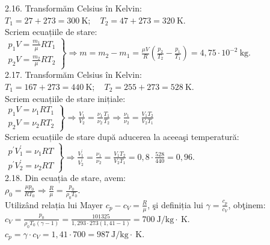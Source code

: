 2.16. Transformăm Celsius în Kelvin:\\ $T_{1}=27+273=300 \mathrm{~K}; \quad T_{2}=47+273=320 \mathrm{~K}$.\\ Scriem ecuațiile de stare:\\ $\left.\begin{array}{l} p_{1} V=\frac{m_{1}}{\mu} R T_{1}\\ p_{2} V=\frac{m_{2}}{\mu} R T_{2} \end{array}\right\} \Rightarrow m=m_{2}-m_{1}=\frac{\mu V}{R}\left(\frac{p_{2}}{T_{2}}-\frac{p_{1}}{T_{1}}\right)=4,75 \cdot 10^{-2} \mathrm{~kg}$.\\

2.17. Transformăm Celsius în Kelvin:\\ $T_{1}=167+273=440 \mathrm{~K}; \quad T_{2}=255+273=528 \mathrm{~K}$.\\ Scriem ecuațiile de stare inițiale:\\ $\left.\begin{array}{l} p_{1} V=\nu_{1} R T_{1}\\ p_{2} V=\nu_{2} R T_{2} \end{array}\right\} \Rightarrow \frac{V_{1}}{V_{2}}=\frac{\nu_{1}}{\nu_{2}} \frac{T_{1}}{T_{2}} \Rightarrow \frac{\nu_{1}}{\nu_{2}}=\frac{V_{1} T_{2}}{V_{2} T_{1}}$\\ Scriem ecuațiile de stare după aducerea la aceeaşi temperatură:\\ $\left.\begin{array}{l} p^{\prime} V_{1}^{\prime}=\nu_{1} R T\\ p^{\prime} V_{2}^{\prime}=\nu_{2} R T \end{array}\right\} \Rightarrow \frac{V_{1}^{\prime}}{V_{2}^{\prime}}=\frac{\nu_{1}}{\nu_{2}}=\frac{V_{1} T_{2}}{V_{2} T_{1}}=0,8 \cdot \frac{528}{440}=0,96$.\\

2.18. Din ecuația de stare, avem:\\ $\rho_{0}=\frac{\mu p_{0}}{R T_{0}} \Rightarrow \frac{R}{\mu}=\frac{p_{0}}{\rho_{0} T_{0}}$.\\ Utilizând relația lui Mayer $c_{p}-c_{V}=\frac{R}{\mu}$, şi definiția lui $\gamma=\frac{c_{p}}{c_{V}}$, obţinem:\\ $c_{V}=\frac{p_{0}}{\rho_{0} T_{0}(\gamma-1)}=\frac{101325}{1,293 \cdot 273(1,41-1)}=700 \mathrm{~J} / \mathrm{kg} \cdot \mathrm{~K}$.\\ $c_{p}=\gamma \cdot c_{V}=1,41 \cdot 700=987 \mathrm{~J} / \mathrm{kg} \cdot \mathrm{~K}$.\\

